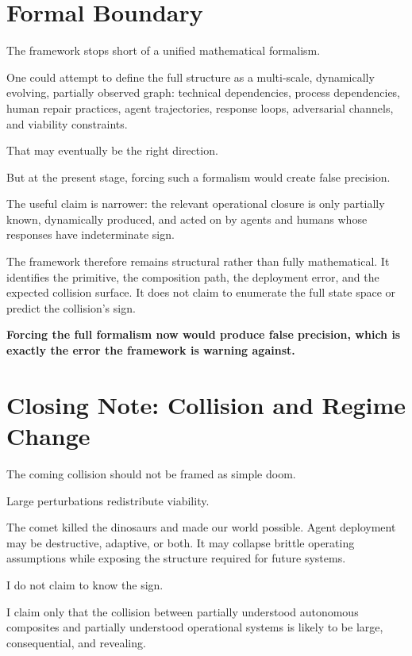 \documentclass[11pt]{article}
\begin{document}
\section{Formal Boundary}

The framework stops short of a unified mathematical formalism.

One could attempt to define the full structure as a multi-scale, dynamically evolving, partially observed graph: technical dependencies, process dependencies, human repair practices, agent trajectories, response loops, adversarial channels, and viability constraints.

That may eventually be the right direction.

But at the present stage, forcing such a formalism would create false precision.

The useful claim is narrower: the relevant operational closure is only partially known, dynamically produced, and acted on by agents and humans whose responses have indeterminate sign.

The framework therefore remains structural rather than fully mathematical. It identifies the primitive, the composition path, the deployment error, and the expected collision surface. It does not claim to enumerate the full state space or predict the collision's sign.

\begin{pullquote}
\textbf{Forcing the full formalism now would produce false precision, which is exactly the error the framework is warning against.}
\end{pullquote}

\section{Closing Note: Collision and Regime Change}

The coming collision should not be framed as simple doom.

Large perturbations redistribute viability.

The comet killed the dinosaurs and made our world possible. Agent deployment may be destructive, adaptive, or both. It may collapse brittle operating assumptions while exposing the structure required for future systems.

I do not claim to know the sign.

I claim only that the collision between partially understood autonomous composites and partially understood operational systems is likely to be large, consequential, and revealing.
\end{document}
